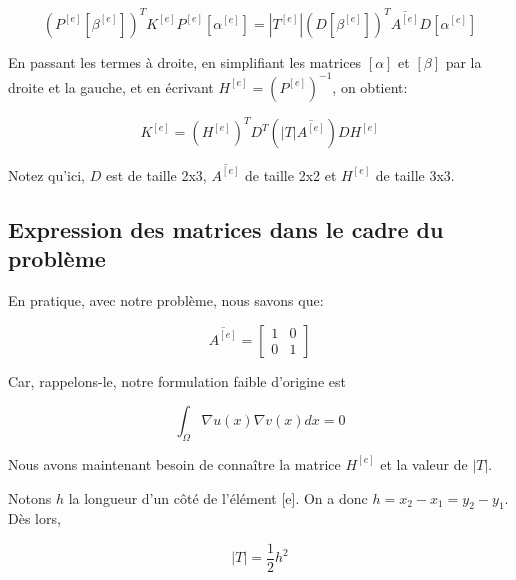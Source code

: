 \documentclass{article}
\begin{document}
\vspace{-0.6cm}

\begin{equation}
    \left(P^{[e]}\left[\beta^{[e]}\right] \right)^T K^{[e]}
    P^{[e]}\left[\alpha^{[e]}\right] = |T^{[e]}|
    \left(D\left[\beta^{[e]}\right]\right)^T
    \overline{A^{[e]}} D\left[\alpha^{[e]}\right]
\end{equation}

\vspace{0.4cm}

En passant les termes à droite, en simplifiant les
matrices $\left[\alpha\right]$ et $\left[\beta\right]$ par
la droite et la gauche, et en écrivant
$H^{[e]} = \left( P^{[e]}\right)^{-1}$, on obtient:

\begin{equation}
    K^{[e]} = \left(H^{[e]}\right)^T D^T
    \left( |T| \overline{A^{[e]}} \right) D H^{[e]}
\end{equation}

Notez qu'ici, $D$ est de taille 2x3, $\overline{A^{[e]}}$
de taille 2x2 et $H^{[e]}$ de taille 3x3.

\subsection{Expression des matrices dans le cadre du problème}

En pratique, avec notre problème, nous savons que:

\begin{equation}
    \overline{A^{[e]}} =
    \begin{bmatrix}
        1 & 0 \\ 0 & 1
    \end{bmatrix}
\end{equation}

Car, rappelons-le, notre formulation faible d'origine est

\begin{equation}
    \int_\Omega \nabla u(x) \nabla v(x) dx = 0
\end{equation}

Nous avons maintenant besoin de connaître la matrice $H^{[e]}$
et la valeur de $|T|$.

Notons $h$ la longueur d'un côté de l'élément [e]. On a donc
$h = x_2 - x_1 = y_2 - y_1$. Dès lors,

\begin{equation}
    |T| = \frac{1}{2} h^2
\end{equation}
\end{document}
